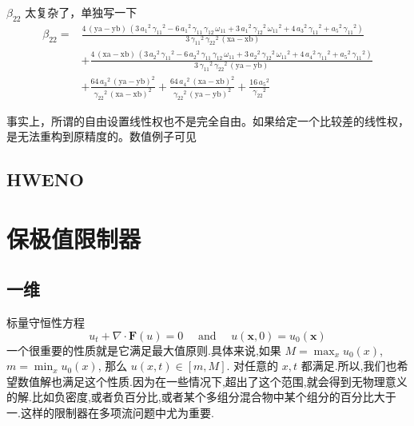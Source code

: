 \documentclass{book}
\begin{document}
$\beta_{22}$ 太复杂了，单独写一下
\begin{equation}
    \begin{aligned}
        \beta_{22} = & \frac{4\,{\left(\mathrm{ya}-\mathrm{yb}\right)}\,{\left(3\,{a_1 }^2 \,{\gamma_{11} }^2 -6\,{a_1 }^2 \,\gamma_{11} \,\gamma_{12} \,\omega_{11} +3\,{a_1 }^2 \,{\gamma_{12} }^2 \,{\omega_{11} }^2 +4\,{a_3 }^2 \,{\gamma_{11} }^2 +{a_5 }^2 \,{\gamma_{11} }^2 \right)}}{3\,{\gamma_{11} }^2 \,{\gamma_{22} }^2 \,{\left(\mathrm{xa}-\mathrm{xb}\right)}}  \\
                     & +\frac{4\,{\left(\mathrm{xa}-\mathrm{xb}\right)}\,{\left(3\,{a_2 }^2 \,{\gamma_{11} }^2 -6\,{a_2 }^2 \,\gamma_{11} \,\gamma_{12} \,\omega_{11} +3\,{a_2 }^2 \,{\gamma_{12} }^2 \,{\omega_{11} }^2 +4\,{a_4 }^2 \,{\gamma_{11} }^2 +{a_5 }^2 \,{\gamma_{11} }^2 \right)}}{3\,{\gamma_{11} }^2 \,{\gamma_{22} }^2 \,{\left(\mathrm{ya}-\mathrm{yb}\right)}} \\
                     & +\frac{64\,{a_3 }^2 \,{{\left(\mathrm{ya}-\mathrm{yb}\right)}}^2 }{{\gamma_{22} }^2 \,{{\left(\mathrm{xa}-\mathrm{xb}\right)}}^2 } + \frac{64\,{a_4 }^2 \,{{\left(\mathrm{xa}-\mathrm{xb}\right)}}^2 }{{\gamma_{22} }^2 \,{{\left(\mathrm{ya}-\mathrm{yb}\right)}}^2 }+\frac{16\,{a_5 }^2 }{{\gamma_{22} }^2 }
    \end{aligned}
\end{equation}

事实上，所谓的自由设置线性权也不是完全自由。如果给定一个比较差的线性权，是无法重构到原精度的。数值例子可见 \cite{RN133}

\subsection{HWENO}




\section{保极值限制器}
\subsection{一维}
\cite{RN6}
标量守恒性方程
\begin{equation}
    u_{t}+\nabla \cdot \mathbf{F}(u)=0 \quad \text { and } \quad u(\mathbf{x}, 0)=u_{0}(\mathbf{x})
\end{equation}
一个很重要的性质就是它满足最大值原则.具体来说,如果 $M=\max_x u_0(x)$,$m=\min_x u_0(x)$, 那么 $u(x,t)\in[m,M]$. 对任意的 $x,t$ 都满足.所以,我们也希望数值解也满足这个性质.因为在一些情况下,超出了这个范围,就会得到无物理意义的解.比如负密度,或者负百分比,或者某个多组分混合物中某个组分的百分比大于一.这样的限制器在多项流问题中尤为重要.\cite{PP-review}
\end{document}
